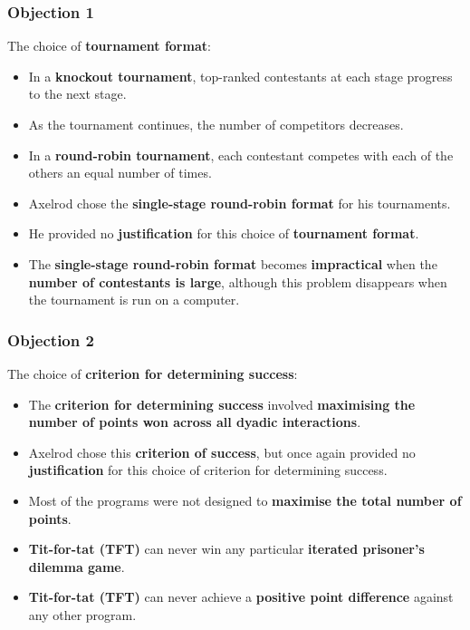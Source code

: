 \documentclass[11pt]{article}
\begin{document}
\subsubsection{Objection 1}
\label{sec:org27e53e5}
The choice of \textbf{tournament format}:
\begin{itemize}
\item In a \textbf{knockout tournament}, top-ranked contestants at each stage progress to the next stage.
\item As the tournament continues, the number of competitors decreases.
\item In a \textbf{round-robin tournament}, each contestant competes with each of the others an equal number of times.
\item Axelrod chose the \textbf{single-stage round-robin format} for his tournaments.
\item He provided no \textbf{justification} for this choice of \textbf{tournament format}.
\item The \textbf{single-stage round-robin format} becomes \textbf{impractical} when the \textbf{number of contestants is large}, although this problem disappears when the tournament is run on a computer.
\end{itemize}
\subsubsection{Objection 2}
\label{sec:org291db92}
The choice of \textbf{criterion for determining success}:
\begin{itemize}
\item The \textbf{criterion for determining success} involved \textbf{maximising the number of points won across all dyadic interactions}.
\item Axelrod chose this \textbf{criterion of success}, but once again provided no \textbf{justification} for this choice of criterion for determining success.
\item Most of the programs were not designed to \textbf{maximise the total number of points}.
\item \textbf{Tit-for-tat (TFT)} can never win any particular \textbf{iterated prisoner's dilemma game}.
\item \textbf{Tit-for-tat (TFT)} can never achieve a \textbf{positive point difference} against any other program.
\end{itemize}
\end{document}
